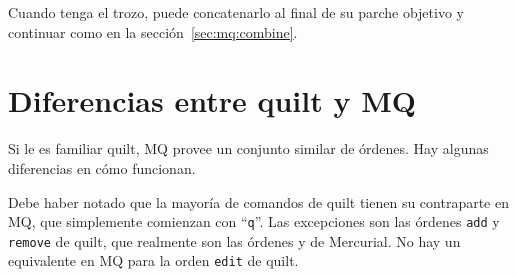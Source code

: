 Cuando tenga el trozo, puede concatenarlo al final de su parche
objetivo y continuar como en la sección~\ref{sec:mq:combine}.

\section{Diferencias entre quilt y MQ}

Si le es familiar quilt, MQ provee un conjunto similar de órdenes. Hay
algunas diferencias en cómo funcionan.

Debe haber notado que la mayoría de comandos de quilt tienen su
contraparte en MQ, que simplemente comienzan con ``\texttt{q}''.  Las
excepciones son las órdenes \texttt{add} y \texttt{remove} de quilt,
que realmente son las órdenes  y  de
Mercurial.  No hay un equivalente en MQ para la orden
\texttt{edit} de quilt.

